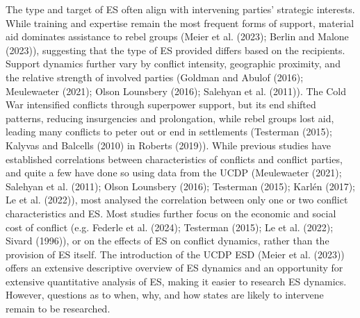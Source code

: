 \documentclass[
]{article}
\begin{document}
The type and target of ES often align with intervening parties'
strategic interests. While training and expertise remain the most
frequent forms of support, material aid dominates assistance to rebel
groups (Meier et al. (2023); Berlin and Malone (2023)), suggesting that
the type of ES provided differs based on the recipients. Support
dynamics further vary by conflict intensity, geographic proximity, and
the relative strength of involved parties (Goldman and Abulof (2016);
Meulewaeter (2021); Olson Lounsbery (2016); Salehyan et al. (2011)). The
Cold War intensified conflicts through superpower support, but its end
shifted patterns, reducing insurgencies and prolongation, while rebel
groups lost aid, leading many conflicts to peter out or end in
settlements (Testerman (2015); Kalyvas and Balcells (2010) in Roberts
(2019)). While previous studies have established correlations between
characteristics of conflicts and conflict parties, and quite a few have
done so using data from the UCDP (Meulewaeter (2021); Salehyan et al.
(2011); Olson Lounsbery (2016); Testerman (2015); Karlén (2017); Le et
al. (2022)), most analysed the correlation between only one or two
conflict characteristics and ES. Most studies further focus on the
economic and social cost of conflict (e.g. Federle et al. (2024);
Testerman (2015); Le et al. (2022); Sivard (1996)), or on the effects of
ES on conflict dynamics, rather than the provision of ES itself. The
introduction of the UCDP ESD (Meier et al. (2023)) offers an extensive
descriptive overview of ES dynamics and an opportunity for extensive
quantitative analysis of ES, making it easier to research ES dynamics.
However, questions as to when, why, and how states are likely to
intervene remain to be researched.
\end{document}
